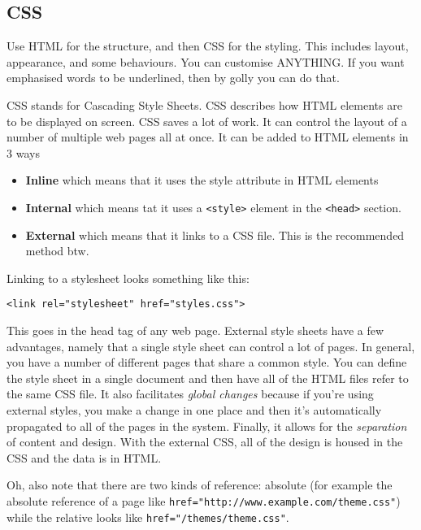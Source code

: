 \documentclass[11pt,a4paper,titlepage,dvipsnames,cmyk]{scrartcl}
\begin{document}
\subsection{CSS}%
\label{sub:CSS}
Use HTML for the structure, and then CSS for the styling. This includes
layout, appearance, and some behaviours. You can customise ANYTHING. If
you want emphasised words to be underlined, then by golly you can do that.

CSS stands for Cascading Style Sheets. CSS describes how HTML elements are
to be displayed on screen. CSS saves a lot of work. It can control the
layout of a number of multiple web pages all at once. It can be added to
HTML elements in 3 ways

\begin{itemize}
    \item \textbf{Inline} which means that it uses the style attribute in
        HTML elements
    \item \textbf{Internal} which means tat it uses a \lstinline{<style>}
        element in the \lstinline{<head>} section.
    \item \textbf{External} which means that it links to a CSS file. This
        is the recommended method btw. 
\end{itemize}

Linking to a stylesheet looks something like this:

\begin{lstlisting}[]
<link rel="stylesheet" href="styles.css">
\end{lstlisting}

This goes in the head tag of any web page. External style sheets have a
few advantages, namely that a single style sheet can control a lot of
pages. In general, you have a number of different pages that share a
common style. You can define the style sheet in a single document and then
have all of the HTML files refer to the same CSS file. It also facilitates
\textit{global changes} because if you're using external styles, you make
a change in one place and then it's automatically propagated to all of the
pages in the system. Finally, it allows for the \textit{separation} of
content and design. With the external CSS, all of the design is housed in
the CSS and the data is in HTML.

Oh, also note that there are two kinds of reference: absolute (for example
the absolute reference of a page like
\lstinline{href="http://www.example.com/theme.css"}) while the relative
looks like \lstinline{href="/themes/theme.css"}.
\end{document}
